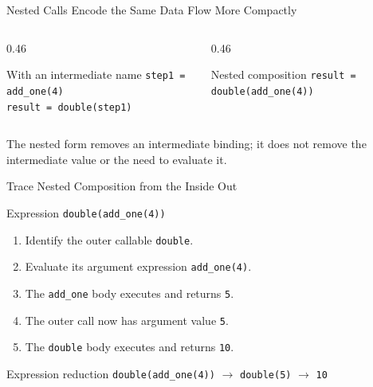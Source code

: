 \documentclass[aspectratio=169,10pt]{beamer}
\begin{document}
\begin{frame}{Nested Calls Encode the Same Data Flow More Compactly}
  \begin{columns}[T,onlytextwidth]
    \begin{column}{0.46\textwidth}
      \begin{block}{With an intermediate name}
        \texttt{step1 = add\_one(4)}\\
        \texttt{result = double(step1)}
      \end{block}
    \end{column}

    \begin{column}{0.46\textwidth}
      \begin{block}{Nested composition}
        \texttt{result = double(add\_one(4))}
      \end{block}
    \end{column}
  \end{columns}

  \begin{keyidea}
    The nested form removes an intermediate binding; it does not remove the intermediate value or the need to evaluate it.
  \end{keyidea}
\end{frame}

\begin{frame}{Trace Nested Composition from the Inside Out}
  \begin{block}{Expression}
    \centering
    \Large\texttt{double(add\_one(4))}
  \end{block}

  \begin{enumerate}
    \item Identify the outer callable \texttt{double}.
    \item Evaluate its argument expression \texttt{add\_one(4)}.
    \item The \texttt{add\_one} body executes and returns \texttt{5}.
    \item The outer call now has argument value \texttt{5}.
    \item The \texttt{double} body executes and returns \texttt{10}.
  \end{enumerate}

  \begin{block}{Expression reduction}
    \centering
    \texttt{double(add\_one(4))} $\rightarrow$ \texttt{double(5)} $\rightarrow$ \texttt{10}
  \end{block}
\end{frame}
\end{document}

